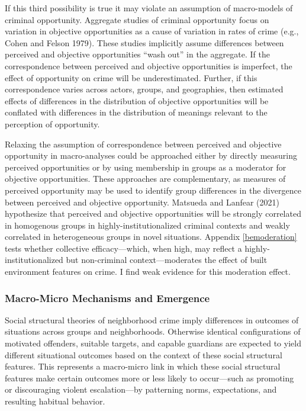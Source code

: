 \documentclass [11pt, proquest] {uwthesis}[2015/03/03]
\begin{document}
If this third possibility is true it may violate an assumption of macro-models of criminal opportunity. Aggregate studies of criminal opportunity focus on variation in objective opportunities as a cause of variation in rates of crime (e.g., Cohen and Felson 1979). These studies implicitly assume differences between perceived and objective opportunities ``wash out'' in the aggregate. If the correspondence between perceived and objective opportunities is imperfect, the effect of opportunity on crime will be underestimated. Further, if this correspondence varies across actors, groups, and geographies, then estimated effects of differences in the distribution of objective opportunities will be conflated with differences in the distribution of meanings relevant to the perception of opportunity.

Relaxing the assumption of correspondence between perceived and objective opportunity in macro-analyses could be approached either by directly measuring perceived opportunities or by using membership in groups as a moderator for objective opportunities. These approaches are complementary, as measures of perceived opportunity may be used to identify group differences in the divergence between perceived and objective opportunity. Matsueda and Lanfear (2021) hypothesize that perceived and objective opportunities will be strongly correlated in homogenous groups in highly-institutionalized criminal contexts and weakly correlated in heterogeneous groups in novel situations. Appendix \ref{bemoderation} tests whether collective efficacy---which, when high, may reflect a highly-institutionalized but non-criminal context---moderates the effect of built environment features on crime. I find weak evidence for this moderation effect.

\hypertarget{macro-micro-mechanisms-and-emergence}{%
\subsubsection{Macro-Micro Mechanisms and Emergence}\label{macro-micro-mechanisms-and-emergence}}

Social structural theories of neighborhood crime imply differences in outcomes of situations across groups and neighborhoods. Otherwise identical configurations of motivated offenders, suitable targets, and capable guardians are expected to yield different situational outcomes based on the context of these social structural features. This represents a macro-micro link in which these social structural features make certain outcomes more or less likely to occur---such as promoting or discouraging violent escalation---by patterning norms, expectations, and resulting habitual behavior.
\end{document}
